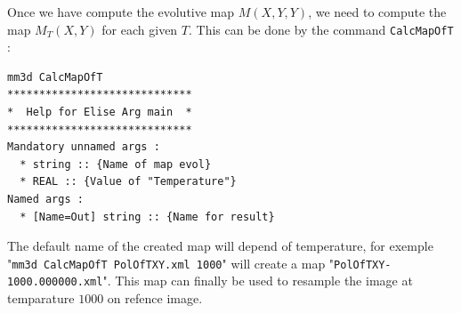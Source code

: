 Once we have compute the evolutive map $M(X,Y,Y)$, we need to compute
the map $M_T(X,Y)$ for each given $T$. This can be done by the command {\tt CalcMapOfT} :

\begin{verbatim}
mm3d CalcMapOfT
*****************************
*  Help for Elise Arg main  *
*****************************
Mandatory unnamed args : 
  * string :: {Name of map evol}
  * REAL :: {Value of "Temperature"}
Named args : 
  * [Name=Out] string :: {Name for result}
\end{verbatim}

The default name of the created map will depend of temperature,
for exemple "{\tt mm3d CalcMapOfT  PolOfTXY.xml  1000}" will create
a map "{\tt PolOfTXY-1000.000000.xml}". This map can finally be
used to resample the image at temparature $1000$ on refence image.



